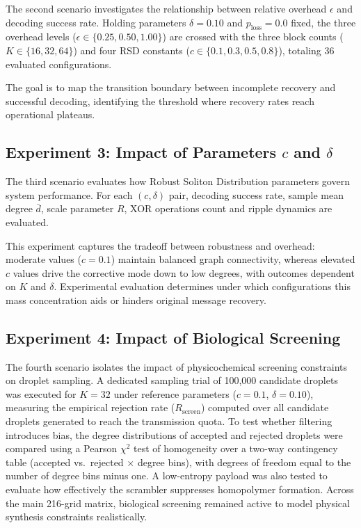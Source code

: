 The second scenario investigates the relationship between relative overhead $\epsilon$ and decoding success rate. Holding parameters $\delta = 0.10$ and $p_{\text{loss}} = 0.0$ fixed, the three overhead levels ($\epsilon \in \{0.25, 0.50, 1.00\}$) are crossed with the three block counts ($K \in \{16, 32, 64\}$) and four RSD constants ($c \in \{0.1, 0.3, 0.5, 0.8\}$), totaling 36 evaluated configurations.

The goal is to map the transition boundary between incomplete recovery and successful decoding, identifying the threshold where recovery rates reach operational plateaus.

\subsection{Experiment 3: Impact of Parameters $c$ and $\delta$}

The third scenario evaluates how Robust Soliton Distribution parameters govern system performance. For each $(c, \delta)$ pair, decoding success rate, sample mean degree $\bar{d}$, scale parameter $R$, XOR operations count and ripple dynamics are evaluated.

This experiment captures the tradeoff between robustness and overhead: moderate values ($c=0.1$) maintain balanced graph connectivity, whereas elevated $c$ values drive the corrective mode down to low degrees, with outcomes dependent on $K$ and $\delta$. Experimental evaluation determines under which configurations this mass concentration aids or hinders original message recovery.

\subsection{Experiment 4: Impact of Biological Screening}

The fourth scenario isolates the impact of physicochemical screening constraints on droplet sampling. A dedicated sampling trial of 100,000 candidate droplets was executed for $K=32$ under reference parameters ($c=0.1$, $\delta=0.10$), measuring the empirical rejection rate ($R_{\text{screen}}$) computed over all candidate droplets generated to reach the transmission quota. To test whether filtering introduces bias, the degree distributions of accepted and rejected droplets were compared using a Pearson $\chi^2$ test of homogeneity over a two-way contingency table (accepted vs.\ rejected $\times$ degree bins), with degrees of freedom equal to the number of degree bins minus one. A low-entropy payload was also tested to evaluate how effectively the scrambler suppresses homopolymer formation. Across the main 216-grid matrix, biological screening remained active to model physical synthesis constraints realistically.

